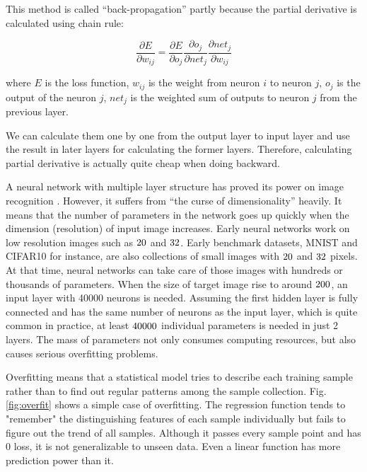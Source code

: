 This method is called \enquote{back-propagation} partly because the partial derivative is calculated using chain rule:

\begin{equation}
\frac{\partial E}{\partial w_{ij}} = \frac{\partial E}{\partial o_j} \frac{\partial o_j}{\partial net_j} \frac{\partial net_j}{\partial w_{ij}}
\end{equation}

where $E$ is the loss function, $w_{ij}$ is the weight from neuron $i$ to neuron $j$, $o_j$ is the output of the neuron $j$, $net_j$ is the weighted sum of outputs to neuron $j$ from the previous layer.

We can calculate them one by one from the output layer to input layer and use the result in later layers for calculating the former layers. Therefore, calculating partial derivative is actually quite cheap when doing backward.

A neural network with multiple layer structure has proved its power on image recognition \cite{Rowley1998}. However, it suffers from \enquote{the curse of dimensionality} heavily. It means that the number of parameters in the network goes up quickly when the dimension (resolution) of input image increases. Early neural networks work on low resolution images such as $20 \time 20$ and $32 \time 32$. Early benchmark datasets, MNIST \cite{LeCun1998} and CIFAR10 \cite{Krizhevsky2009} for instance, are also collections of small images with $20 \time 20$ and $32 \time 32$ pixels. At that time, neural networks can take care of those images with hundreds or thousands of parameters. When the size of target image rise to around $200 \time 200$, an input layer with 40000 neurons is needed. Assuming the first hidden layer is fully connected and has the same number of neurons as the input layer, which is quite common in practice, at least $40000 \time 40000$ individual parameters is needed in just 2 layers. The mass of parameters not only consumes computing resources, but also causes serious overfitting problems. 

Overfitting means that a statistical model tries to describe each training sample rather than to find out regular patterns among the sample collection. Fig.\ref{fig:overfit} shows a simple case of overfitting. The regression function tends to "remember" the distinguishing features of each sample individually but fails to figure out the trend of all samples. Although it passes every sample point and has 0 loss, it is not generalizable to unseen data. Even a linear function has more prediction power than it. 

